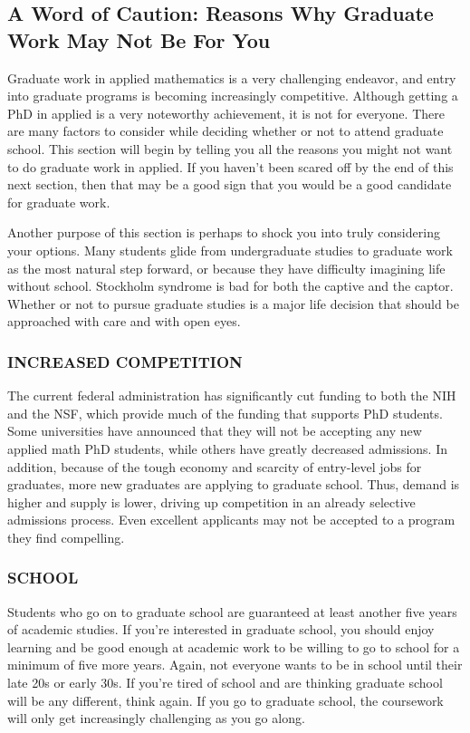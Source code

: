 \documentclass[11pt]{article}
\begin{document}
\subsection{A Word of Caution: Reasons Why Graduate Work May Not Be For You}
Graduate work in applied mathematics is a very challenging endeavor, and entry into graduate programs is becoming increasingly competitive. Although getting a PhD in applied is a very noteworthy achievement, it is not for everyone. There are many factors to consider while deciding whether or not to attend graduate school. This section will begin by telling you all the reasons you might not want to do graduate work in applied. If you haven’t been scared off by the end of this next section, then that may be a good sign that you would be a good candidate for graduate work.

Another purpose of this section is perhaps to shock you into truly considering your options. Many students glide from undergraduate studies to graduate work as the most natural step forward, or because they have difficulty imagining life without school. Stockholm syndrome is bad for both the captive and the captor. Whether or not to pursue graduate studies is a major life decision that should be approached with care and with open eyes.

\subsubsection*{INCREASED COMPETITION}
The current federal administration has significantly cut funding to both the NIH and the NSF, which provide much of the funding that supports PhD students. Some universities have announced that they will not be accepting any new applied math PhD students, while others have greatly decreased admissions. In addition, because of the tough economy and scarcity of entry-level jobs for graduates, more new graduates are applying to graduate school. Thus, demand is higher and supply is lower, driving up competition in an already selective admissions process. Even excellent applicants may not be accepted to a program they find compelling.

\subsubsection*{SCHOOL}
Students who go on to graduate school are guaranteed at least another five years of academic studies. If you’re interested in graduate school, you should enjoy learning and be good enough at academic work to be willing to go to school for a minimum of five more years. Again, not everyone wants to be in school until their late 20s or early 30s. If you’re tired of school and are thinking graduate school will be any different, think again. If you go to graduate school, the coursework will only get increasingly challenging as you go along.
\end{document}
